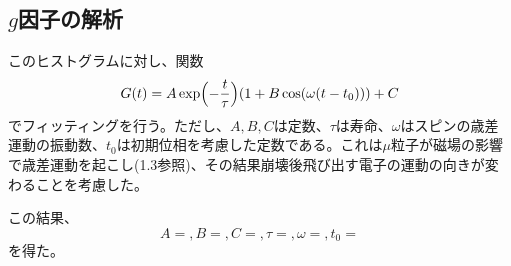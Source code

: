 \subsection{$g$因子の解析}

このヒストグラムに対し、関数
\begin{equation}
G(t)=A\exp\Bigl(-\frac{t}{\tau}\Bigr)(1+B\cos(\omega(t-t_0)))+C
\end{equation}
でフィッティングを行う。ただし、$A,B,C$は定数、$\tau$は寿命、$\omega$はスピンの歳差運動の振動数、$t_0$は初期位相を考慮した定数である。これは$\mu$粒子が磁場の影響で歳差運動を起こし(1.3参照)、その結果崩壊後飛び出す電子の運動の向きが変わることを考慮した。


この結果、
\begin{equation}
A= ,B= ,C= ,\tau= ,\omega= ,t_0=
\end{equation}
を得た。
